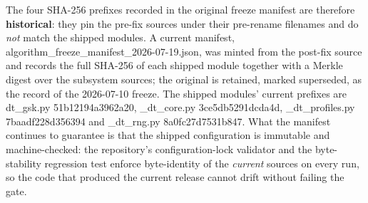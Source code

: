 \documentclass[algorithms,article,submit,moreauthors,pdftex]{Definitions/mdpi}
\begin{document}
\noindent The four SHA-256 prefixes recorded in the original freeze manifest are
therefore \textbf{historical}: they pin the pre-fix sources under their pre-rename
filenames and do \emph{not} match the shipped modules. A current manifest,
algorithm\_freeze\_manifest\_2026-07-19.json, was minted from the
post-fix source and records the full SHA-256 of each shipped module together
with a Merkle digest over the subsystem sources; the original is retained,
marked superseded, as the record of the 2026-07-10 freeze. The shipped modules'
current prefixes are
dt\_gsk.py 51b12194a3962a20,
\_dt\_core.py 3ce5db5291dcda4d,
\_dt\_profiles.py 7baadf228d356394 and
\_dt\_rng.py 8a0fc27d7531b847.
What the manifest continues to guarantee is that the shipped configuration is
immutable and machine-checked: the repository's configuration-lock validator and
the byte-stability regression test enforce byte-identity of the \emph{current}
sources on every run, so the code that produced the current release cannot drift
without failing the gate.
\end{document}
